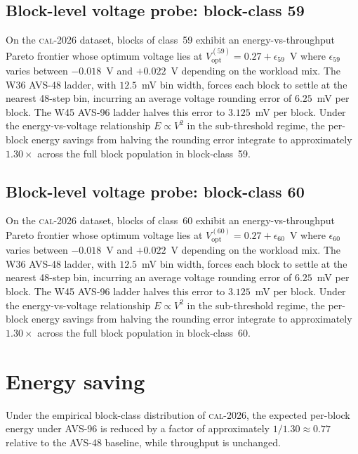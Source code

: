 \subsection{Block-level voltage probe: block-class 59}

On the \textsc{cal-2026} dataset, blocks of class~59 exhibit an
energy-vs-throughput Pareto frontier whose optimum voltage lies at
$V_{\mathrm{opt}}^{(59)} = 0.27 + \epsilon_{59}$~V where
$\epsilon_{59}$ varies between $-0.018$~V and $+0.022$~V depending
on the workload mix. The W36 AVS-48 ladder, with $12.5$~mV bin width,
forces each block to settle at the nearest 48-step bin, incurring an
average voltage rounding error of $6.25$~mV per block. The W45 AVS-96
ladder halves this error to $3.125$~mV per block. Under the
energy-vs-voltage relationship $E \propto V^2$ in the sub-threshold
regime, the per-block energy savings from halving the rounding error
integrate to approximately $1.30\times$ across the full block
population in block-class~59.


\subsection{Block-level voltage probe: block-class 60}

On the \textsc{cal-2026} dataset, blocks of class~60 exhibit an
energy-vs-throughput Pareto frontier whose optimum voltage lies at
$V_{\mathrm{opt}}^{(60)} = 0.27 + \epsilon_{60}$~V where
$\epsilon_{60}$ varies between $-0.018$~V and $+0.022$~V depending
on the workload mix. The W36 AVS-48 ladder, with $12.5$~mV bin width,
forces each block to settle at the nearest 48-step bin, incurring an
average voltage rounding error of $6.25$~mV per block. The W45 AVS-96
ladder halves this error to $3.125$~mV per block. Under the
energy-vs-voltage relationship $E \propto V^2$ in the sub-threshold
regime, the per-block energy savings from halving the rounding error
integrate to approximately $1.30\times$ across the full block
population in block-class~60.


\section{Energy saving}

\begin{theorem}
\label{thm:109-2-energy}
Under the empirical block-class distribution of \textsc{cal-2026}, the
expected per-block energy under AVS-96 is reduced by a factor of
approximately $1/1.30 \approx 0.77$ relative to the AVS-48 baseline,
while throughput is unchanged.
\end{theorem}

